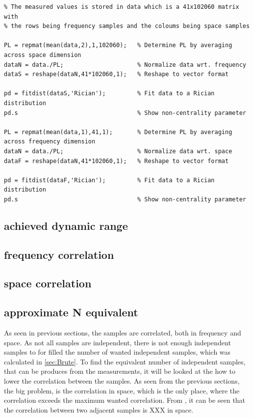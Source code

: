 \begin{lstlisting}
% The measured values is stored in data which is a 41x102060 matrix with
% the rows being frequency samples and the coloums being space samples

PL = repmat(mean(data,2),1,102060);   % Determine PL by averaging across space dimension 
dataN = data./PL;                     % Normalize data wrt. frequency
dataS = reshape(dataN,41*102060,1);   % Reshape to vector format

pd = fitdist(dataS,'Rician');         % Fit data to a Rician distribution
pd.s                                  % Show non-centrality parameter

PL = repmat(mean(data,1),41,1);       % Determine PL by averaging across frequency dimension
dataN = data./PL;                     % Normalize data wrt. space
dataF = reshape(dataN,41*102060,1);   % Reshape to vector format

pd = fitdist(dataF,'Rician');         % Fit data to a Rician distribution
pd.s                                  % Show non-centrality parameter
\end{lstlisting}

 

\subsection{achieved dynamic range}
\subsection{frequency correlation}


\subsection{space correlation}
\subsection{approximate N equivalent}

As seen in previous sections, the samples are correlated, both in frequency and space. As not all samples are independent, there is not enough independent samples to for filled the number of wanted independent samples, which was calculated in \autoref{sec:Brute}. To find the equivalent number of independent samples, that can be produces from the measurements, it will be looked at the how to lower the correlation between the samples. As seen from the previous sections, the big problem, is the correlation in space, which is the only place, where the correlation exceeds the maximum wanted correlation. From , it can be seen that the correlation between two adjacent samples is XXX in space. 


